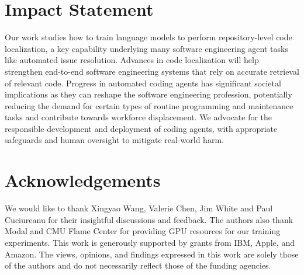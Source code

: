 \section*{Impact Statement}
Our work studies how to train language models to perform repository-level code localization, a key capability underlying many software engineering agent tasks like automated issue resolution. Advances in code localization will help strengthen end-to-end software engineering systems that rely on accurate retrieval of relevant code. Progress in automated coding agents has significant societal implications as they can reshape the software engineering profession, potentially reducing the demand for certain types of routine programming and maintenance tasks and contribute towards workforce displacement. We advocate for the responsible development and deployment of coding agents, with appropriate safeguards and human oversight to mitigate real-world harm.

\section*{Acknowledgements}
We would like to thank Xingyao Wang, Valerie Chen, Jim White and Paul Cuciureanu for their insightful discussions and feedback. The authors also thank Modal and CMU Flame Center for providing GPU resources for our training experiments. This work is generously supported by grants from IBM, Apple, and Amazon. The views, opinions, and findings expressed in this work are solely those of the authors and do not necessarily reflect those of the funding agencies.